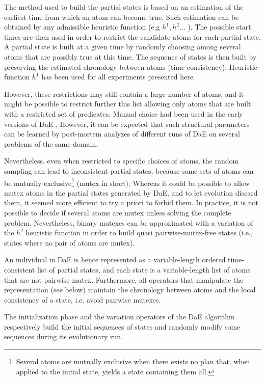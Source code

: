 \documentclass{acm_proc_article-sp}
\begin{document}
The method used to build the partial states is based on an estimation of the earliest time from which an atom can become true. Such estimation can be obtained by any admissible heuristic function (e.g $h^1,h^2...$ \cite{HaslumGeffner-AIPS-2000}). The possible start times are then used in order to restrict the candidate atoms for each partial state. A partial state is built at a given time by randomly choosing among several atoms that are possibly true at this time. The sequence of states is then built by preserving the estimated chronology between atoms (time consistency). Heuristic function $h^1$ has been used for all experiments presented here.

However, these restrictions may still contain a large number of atoms, and it might be possible to restrict further this list allowing only atoms that are built with a restricted set of predicates. Manual choice had been used in the early versions of DaE \cite{deterministic:IPC6}. However, it can be expected that such structural parameters can be learned by post-mortem analyzes of different runs of DaE on several problems of the same domain. 

Nevertheless, even when restricted to specific choices of atoms, the random sampling can lead to inconsistent partial states, because some sets of atoms can be mutually exclusive\footnote{Several atoms are mutually exclusive when there exists no plan that, when applied to the initial state, yields a state containing them all.} (mutex in short). Whereas it could be possible to allow mutex atoms in the partial states generated by DaE, and to let evolution discard them, it seemed more efficient to try a priori to forbid them. In practice, it is not possible to decide if several atoms are mutex unless solving the complete problem. Nevertheless, binary mutexes can be approximated with a variation of the $h^2$ heuristic function \cite{HaslumGeffner-AIPS-2000} in order to build quasi pairwise-mutex-free states (i.e., states where no pair of atoms are mutex).

An individual in DaE is hence represented as a variable-length ordered time-consistent list of partial states, and each state is a variable-length list of atoms that are not pairwise mutex. Furthermore, all operators that manipulate the representation (see below) maintain the chronology between atoms and the local consistency of a state, i.e. avoid pairwise mutexes.

The initialization phase and the variation operators of the DaE algorithm respectively build the initial sequences of states and randomly modify some sequences during its evolutionary run.
\end{document}
